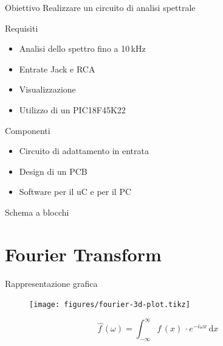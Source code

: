 \documentclass[10pt, xetex, handout]{beamer}
\newcommand{\dd}[1]{\mathrm{d}#1}
\begin{document}
\begin{frame}{Obiettivo}
    Realizzare un circuito di analisi spettrale
    \begin{block}{Requisiti}
    \begin{itemize}
        \item Analisi dello spettro fino a 10\,kHz
        \item Entrate Jack e RCA
        \item Visualizzazione 
        \item Utilizzo di un PIC18F45K22
    \end{itemize}
    \end{block}
    
    \pause
    \begin{block}{Componenti}
    \begin{itemize}
        \item Circuito di adattamento in entrata
        \item Design di un PCB
        \item Software per il uC e per il PC
    \end{itemize}
    \end{block}
\end{frame}

\begin{frame}{Schema a blocchi}
    \begin{figure} \centering
    \end{figure}
\end{frame}

\section{Fourier Transform}
\begin{frame}{Rappresentazione grafica}
    \begin{figure} \centering
        \texttt{[image: figures/fourier-3d-plot.tikz]}
    \end{figure}
    \[
        \hat{f\,} (\omega) 
        = \int_{-\infty}^\infty f\,(x)\,\cdot e^{-i\omega x}\,\dd{x}
    \]
\end{frame}
\end{document}
